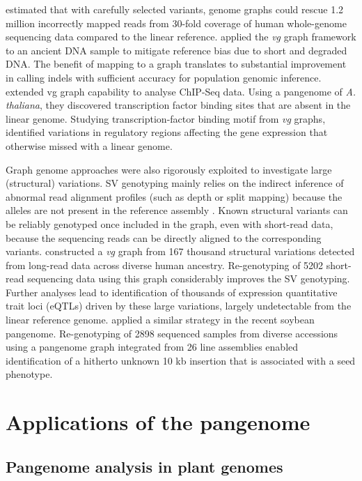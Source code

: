 \documentclass[../main.tex]{subfiles}
\begin{document}
\citet{pritt2018forge} estimated that with carefully selected variants, genome graphs could rescue 1.2 million incorrectly mapped reads from 30-fold coverage of human whole-genome sequencing data compared to the linear reference. \citet{martiniano2019removing} applied the \emph{vg} graph framework to an ancient DNA sample to mitigate reference bias due to short and degraded DNA. The benefit of mapping to a graph translates to substantial improvement in calling indels with sufficient accuracy for population genomic inference. \citet{grytten2019graph} extended vg graph capability to analyse ChIP-Seq data. Using a pangenome  of \emph{A. thaliana}, they discovered transcription factor binding sites that are absent in the linear genome. Studying transcription-factor binding motif from \emph{vg} graphs, \citet{tognon2021grafimo} identified variations in regulatory regions affecting the gene expression that otherwise missed with a linear genome. 

Graph genome approaches were also rigorously exploited to investigate large (structural) variations. SV genotyping mainly relies on the indirect inference of abnormal read alignment profiles (such as depth or split mapping) because the alleles are not present in the reference assembly \citep{mahmoud2019structural}. Known structural variants can be reliably  genotyped once included in the graph, even with short-read data, because the sequencing reads can be directly aligned to the corresponding variants. \citet{siren2020haplotype} constructed a \emph{vg} graph from 167 thousand structural variations detected from long-read data across diverse human ancestry. Re-genotyping of 5202 short-read sequencing data using this graph considerably improves the SV genotyping. Further analyses lead to identification of thousands of expression quantitative trait loci (eQTLs) driven by these large variations, largely undetectable from the linear reference genome. \citet{liu2020pan}  applied a similar strategy in the recent soybean pangenome. Re-genotyping of 2898 sequenced samples from diverse accessions using a pangenome graph integrated from 26 line assemblies enabled identification of a hitherto unknown 10 kb insertion that is associated with a seed phenotype. 

\section{Applications of the pangenome}

\subsection{Pangenome analysis in plant genomes}
\end{document}
